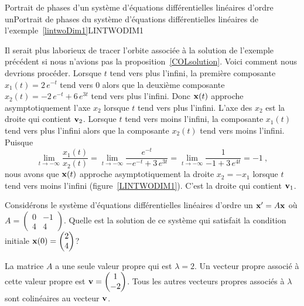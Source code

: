 {
{Portrait de phases d'un système d'équations différentielles linéaires
d'ordre un}{Portrait de phases du système d'équations différentielles
linéaires de l'exemple~\ref{lintwoDim1}}{LINTWODIM1}

\begin{rmk}
Il serait plus laborieux de tracer l'orbite associée à la solution de
l'exemple précédent si nous n'avions pas la
proposition~\ref{COLsolution}.  Voici comment nous devrions procéder.
Lorsque $t$ tend vers plus l'infini, la première composante
$x_1(t) = 2 \, e^{-t}$ tend vers $0$ alors que la deuxième composante
$x_2(t) = -2 \, e^{-t} +6 \, e^{3t}$ tend vers plus l'infini.  Donc
$\mathbf{x}(t)$ approche asymptotiquement l'axe $x_2$ lorsque $t$ tend
vers plus l'infini.  L'axe des $x_2$ est la droite qui contient
$\mathbf{v}_2$.  Lorsque $t$ tend vers moins l'infini, la composante
$x_1(t)$ tend vers plus l'infini alors que la composante $x_2(t)$
tend vers moins l'infini.  Puisque
\[
\lim_{t\rightarrow -\infty} \frac{x_1(t)}{x_2(t)}
= \lim_{t\rightarrow -\infty} \frac{e^{-t}}{-e^{-t} +3\, e^{3t}}
= \lim_{t\rightarrow -\infty} \frac{1}{-1 + 3\,e^{4t}} = -1 \ ,
\]
nous avons que $\mathbf{x}(t)$ approche asymptotiquement la droite
$x_2=-x_1$ lorsque $t$ tend vers moins l'infini (figure~\ref{LINTWODIM1}).
C'est la droite qui contient $\mathbf{v}_1$.
\end{rmk}

\begin{egg}
Considérons le système d'équations différentielles linéaires d'ordre un
$\mathbf{x}' = A\mathbf{x}$ où
$\displaystyle A = \begin{pmatrix} 0 & -1 \\ 4 & 4 \end{pmatrix}$.
Quelle est la solution de ce système qui satisfait la condition initiale
$\displaystyle \mathbf{x}(0) = \begin{pmatrix} 2 \\ 4 \end{pmatrix}$?

La matrice $A$ a une seule valeur propre qui est $\lambda=2$.  Un
vecteur propre associé à cette valeur propre est
$\displaystyle \mathbf{v} = \begin{pmatrix} 1 \\ -2 \end{pmatrix}$.
Tous les autres vecteurs propres associés à $\lambda$ sont colinéaires au
vecteur $\mathbf{v}$.


\end{egg}}
